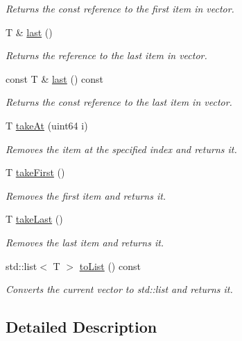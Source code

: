 \begin{DoxyCompactItemize}
\begin{DoxyCompactList}\small\item\em Returns the const reference to the first item in vector. \end{DoxyCompactList}\item 
T \& \mbox{\hyperlink{class_a_vector_a0465c474ee53f57eb8817a531ac530b2}{last}} ()
\begin{DoxyCompactList}\small\item\em Returns the reference to the last item in vector. \end{DoxyCompactList}\item 
const T \& \mbox{\hyperlink{class_a_vector_afbdc200be19695bebbbc54dce5693f98}{last}} () const
\begin{DoxyCompactList}\small\item\em Returns the const reference to the last item in vector. \end{DoxyCompactList}\item 
T \mbox{\hyperlink{class_a_vector_a37df3ccd66a7747579aee01025e0e440}{take\+At}} (uint64 i)
\begin{DoxyCompactList}\small\item\em Removes the item at the specified index and returns it. \end{DoxyCompactList}\item 
T \mbox{\hyperlink{class_a_vector_ae2cad9bb2968e2fe2c96554f6b36c4a9}{take\+First}} ()
\begin{DoxyCompactList}\small\item\em Removes the first item and returns it. \end{DoxyCompactList}\item 
T \mbox{\hyperlink{class_a_vector_abaa54e33aa13edba5b2e4cad679f5c1b}{take\+Last}} ()
\begin{DoxyCompactList}\small\item\em Removes the last item and returns it. \end{DoxyCompactList}\item 
std\+::list$<$ T $>$ \mbox{\hyperlink{class_a_vector_a2563a5dbe02466a864d33af52c327198}{to\+List}} () const
\begin{DoxyCompactList}\small\item\em Converts the current vector to std\+::list and returns it. \end{DoxyCompactList}\end{DoxyCompactItemize}


\subsection{Detailed Description}
